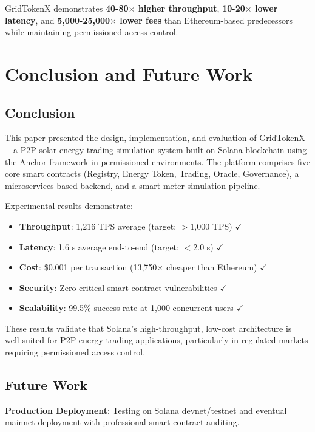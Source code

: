 \documentclass[conference]{IEEEtran}
\begin{document}
GridTokenX demonstrates \textbf{40-80$\times$ higher throughput}, \textbf{10-20$\times$ lower latency}, and \textbf{5,000-25,000$\times$ lower fees} than Ethereum-based predecessors while maintaining permissioned access control.

\section{Conclusion and Future Work}

\subsection{Conclusion}

This paper presented the design, implementation, and evaluation of GridTokenX---a P2P solar energy trading simulation system built on Solana blockchain using the Anchor framework in permissioned environments. The platform comprises five core smart contracts (Registry, Energy Token, Trading, Oracle, Governance), a microservices-based backend, and a smart meter simulation pipeline.

Experimental results demonstrate:
\begin{itemize}
    \item \textbf{Throughput}: 1,216 TPS average (target: $>$1,000 TPS) $\checkmark$
    \item \textbf{Latency}: 1.6 s average end-to-end (target: $<$2.0 s) $\checkmark$
    \item \textbf{Cost}: \$0.001 per transaction (13,750$\times$ cheaper than Ethereum) $\checkmark$
    \item \textbf{Security}: Zero critical smart contract vulnerabilities $\checkmark$
    \item \textbf{Scalability}: 99.5\% success rate at 1,000 concurrent users $\checkmark$
\end{itemize}

These results validate that Solana's high-throughput, low-cost architecture is well-suited for P2P energy trading applications, particularly in regulated markets requiring permissioned access control.

\subsection{Future Work}

\textbf{Production Deployment}: Testing on Solana devnet/testnet and eventual mainnet deployment with professional smart contract auditing.
\end{document}
